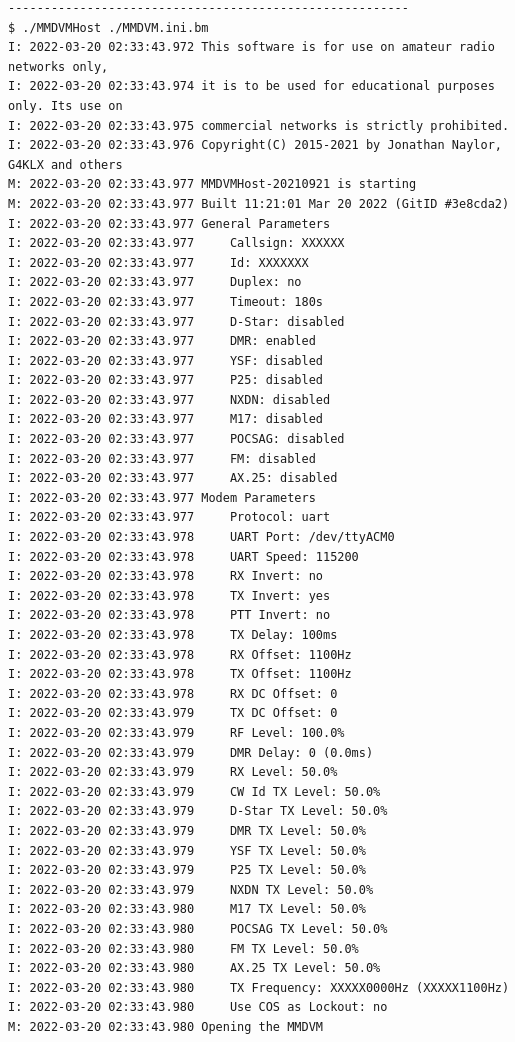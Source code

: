 \documentclass[a4j,oneside]{ujbook}
\begin{document}
\begin{verbatim}
--------------------------------------------------------
$ ./MMDVMHost ./MMDVM.ini.bm
I: 2022-03-20 02:33:43.972 This software is for use on amateur radio
networks only,
I: 2022-03-20 02:33:43.974 it is to be used for educational purposes
only. Its use on
I: 2022-03-20 02:33:43.975 commercial networks is strictly prohibited.
I: 2022-03-20 02:33:43.976 Copyright(C) 2015-2021 by Jonathan Naylor,
G4KLX and others
M: 2022-03-20 02:33:43.977 MMDVMHost-20210921 is starting
M: 2022-03-20 02:33:43.977 Built 11:21:01 Mar 20 2022 (GitID #3e8cda2)
I: 2022-03-20 02:33:43.977 General Parameters
I: 2022-03-20 02:33:43.977     Callsign: XXXXXX
I: 2022-03-20 02:33:43.977     Id: XXXXXXX
I: 2022-03-20 02:33:43.977     Duplex: no
I: 2022-03-20 02:33:43.977     Timeout: 180s
I: 2022-03-20 02:33:43.977     D-Star: disabled
I: 2022-03-20 02:33:43.977     DMR: enabled
I: 2022-03-20 02:33:43.977     YSF: disabled
I: 2022-03-20 02:33:43.977     P25: disabled
I: 2022-03-20 02:33:43.977     NXDN: disabled
I: 2022-03-20 02:33:43.977     M17: disabled
I: 2022-03-20 02:33:43.977     POCSAG: disabled
I: 2022-03-20 02:33:43.977     FM: disabled
I: 2022-03-20 02:33:43.977     AX.25: disabled
I: 2022-03-20 02:33:43.977 Modem Parameters
I: 2022-03-20 02:33:43.977     Protocol: uart
I: 2022-03-20 02:33:43.978     UART Port: /dev/ttyACM0
I: 2022-03-20 02:33:43.978     UART Speed: 115200
I: 2022-03-20 02:33:43.978     RX Invert: no
I: 2022-03-20 02:33:43.978     TX Invert: yes
I: 2022-03-20 02:33:43.978     PTT Invert: no
I: 2022-03-20 02:33:43.978     TX Delay: 100ms
I: 2022-03-20 02:33:43.978     RX Offset: 1100Hz
I: 2022-03-20 02:33:43.978     TX Offset: 1100Hz
I: 2022-03-20 02:33:43.978     RX DC Offset: 0
I: 2022-03-20 02:33:43.979     TX DC Offset: 0
I: 2022-03-20 02:33:43.979     RF Level: 100.0%
I: 2022-03-20 02:33:43.979     DMR Delay: 0 (0.0ms)
I: 2022-03-20 02:33:43.979     RX Level: 50.0%
I: 2022-03-20 02:33:43.979     CW Id TX Level: 50.0%
I: 2022-03-20 02:33:43.979     D-Star TX Level: 50.0%
I: 2022-03-20 02:33:43.979     DMR TX Level: 50.0%
I: 2022-03-20 02:33:43.979     YSF TX Level: 50.0%
I: 2022-03-20 02:33:43.979     P25 TX Level: 50.0%
I: 2022-03-20 02:33:43.979     NXDN TX Level: 50.0%
I: 2022-03-20 02:33:43.980     M17 TX Level: 50.0%
I: 2022-03-20 02:33:43.980     POCSAG TX Level: 50.0%
I: 2022-03-20 02:33:43.980     FM TX Level: 50.0%
I: 2022-03-20 02:33:43.980     AX.25 TX Level: 50.0%
I: 2022-03-20 02:33:43.980     TX Frequency: XXXXX0000Hz (XXXXX1100Hz)
I: 2022-03-20 02:33:43.980     Use COS as Lockout: no
M: 2022-03-20 02:33:43.980 Opening the MMDVM


\end{verbatim}
\end{document}
